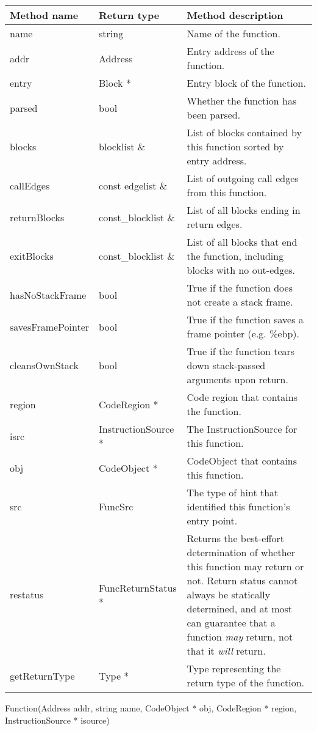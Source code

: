 \begin{tabular}{p{1.25in}p{1.125in}p{3.125in}}
\toprule
Method name & Return type & Method description \\
\midrule
name & string & Name of the function. \\
addr & Address & Entry address of the function.  \\
entry & Block * & Entry block of the function. \\
parsed & bool & Whether the function has been parsed. \\
blocks & blocklist \& & List of blocks contained by this function sorted by entry address. \\
callEdges & const edgelist \& & List of outgoing call edges from this function. \\
returnBlocks & const\_blocklist \& & List of all blocks ending in return edges. \\
exitBlocks & const\_blocklist \& & List of all blocks that end the function, including blocks with no out-edges. \\
hasNoStackFrame & bool & True if the function does not create a stack frame. \\
savesFramePointer & bool & True if the function saves a frame pointer (e.g. \%ebp). \\
cleansOwnStack & bool & True if the function tears down stack-passed arguments upon return. \\
region & CodeRegion * & Code region that contains the function. \\
isrc & InstructionSource * & The InstructionSource for this function. \\
obj & CodeObject * & CodeObject that contains this function. \\
src & FuncSrc & The type of hint that identified this function's entry point. \\
restatus & FuncReturnStatus * & Returns the best-effort determination of whether this function may return or not. Return status cannot always be statically determined, and at most can guarantee that a function \emph{may} return, not that it \emph{will} return. \\
getReturnType & Type * & Type representing the return type of the function. \\

\bottomrule
\end{tabular}

\begin{apient}
Function(Address addr,
         string name,
         CodeObject * obj,
         CodeRegion * region,
         InstructionSource * isource)
\end{apient}

